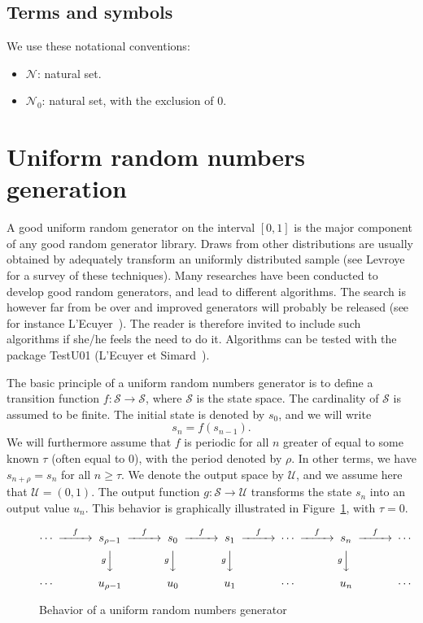 \subsection{Terms and symbols}

We use these notational conventions:
\begin{itemize}
\item
$\mathcal{N}$: natural set.
\item
$\mathcal{N}_0$: natural set, with the exclusion of 0.
\end{itemize}


\section{Uniform random numbers generation}
\label{sec:uniform}

A good uniform random generator on the interval $[0,1]$ is the major
component of any good random generator library. Draws from other
distributions are usually obtained by adequately transform an
uniformly distributed sample (see Levroye~\cite{Levr86} for a survey
of these techniques).
Many researches have been conducted to develop good random generators,
and lead to different algorithms.
The search is however far from be over and
improved generators will probably be released (see for instance
L'Ecuyer~\cite{LEcu97}).
The reader is therefore invited to include such algorithms if she/he feels the need to do it.
Algorithms can be tested with the package TestU01 (L'Ecuyer et
Simard~\cite{LEcuSima07}).

The basic principle of a uniform random numbers generator is to define
a transition function $f: \mathcal{S} \rightarrow \mathcal{S}$, where
$\mathcal{S}$ is the state space.
The cardinality of $\mathcal{S}$ is assumed to be finite.
The initial state is denoted by $s_0$, and we will write
\[
s_n = f(s_{n-1}).
\]
We will furthermore assume that $f$ is periodic for all $n$ greater of
equal to some known $\tau$ (often equal to 0), with the period denoted
by $\rho$.
In other terms, we have $s_{n+\rho} = s_n$ for all $n\ge\tau$.
We denote the output space by $\mathcal{U}$, and we assume here that
$\mathcal{U} = (0,1)$.
The output function $g: \mathcal{S} \rightarrow \mathcal{U}$
transforms the state $s_n$ into an output value $u_n$.
This behavior is graphically illustrated in Figure~\ref{fig:rng}, with
$\tau = 0$.
\begin{figure}[htbp]
\[
\begin{CD}
 \cdots @>f>> s_{\rho-1} @>f>> s_0 @>f>> s_1  @>f>> 
  \cdots @>f>> s_n @>f>> \cdots \\ 
%
  @. @V{g}VV  @V{g}VV   @V{g}VV   
  @.  @V{g}VV  \\
%
 \cdots @. u_{\rho-1} @. u_0
 @.  u_1  @.   \cdots @.  u_n @.  \cdots \\
\end{CD}
\]
\label{fig:rng}
\caption{Behavior of a uniform random numbers generator}
\end{figure}

